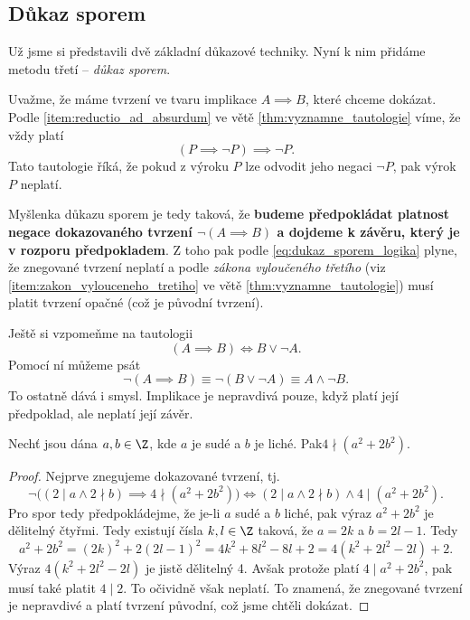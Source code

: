 \subsection{Důkaz sporem}\label{subsec:dukaz_sporem}
Už jsme si představili dvě základní důkazové techniky. Nyní k nim přidáme metodu třetí -- \emph{důkaz sporem}.\par
Uvažme, že máme tvrzení ve tvaru implikace $A \implies B$, které chceme dokázat. Podle \ref{item:reductio_ad_absurdum} ve větě \ref{thm:vyznamne_tautologie} víme, že vždy platí
\begin{equation}\label{eq:dukaz_sporem_logika}
    (P \implies \neg P) \implies \neg P.
\end{equation}
Tato tautologie říká, že pokud z výroku $P$ lze odvodit jeho negaci $\neg P$, pak výrok $P$ neplatí.\par
Myšlenka důkazu sporem je tedy taková, že \textbf{budeme předpokládat platnost negace dokazovaného tvrzení $\neg (A \implies B)$ a dojdeme k závěru, který je v rozporu předpokladem}. Z toho pak podle \eqref{eq:dukaz_sporem_logika} plyne, že znegované tvrzení neplatí a podle \emph{zákona vyloučeného třetího} (viz \ref{item:zakon_vylouceneho_tretiho} ve větě \ref{thm:vyznamne_tautologie}) musí platit tvrzení opačné (což je původní tvrzení).\par
Ještě si vzpomeňme na tautologii
\begin{equation*}
    (A \implies B) \iff B \lor \neg A.
\end{equation*}
Pomocí ní můžeme psát
\begin{equation*}
    \neg (A \implies B) \equiv \neg (B \lor \neg A) \equiv A \land \neg B.
\end{equation*}
To ostatně dává i smysl. Implikace je nepravdivá pouze, když platí její předpoklad, ale neplatí její závěr.
\begin{proposition}
    Nechť jsou dána $a,b\in\Z$, kde $a$ je sudé a $b$ je liché. Pak\linebreak $4 \nmid (a^2+2b^2)$.
\end{proposition}
\begin{proof}
    Nejprve znegujeme dokazované tvrzení, tj.
    \begin{equation*}
        \neg \big((2 \mid a \land 2 \nmid b) \implies 4 \nmid (a^2+2b^2)\big) \iff (2 \mid a \land 2 \nmid b) \land 4 \mid (a^2+2b^2).
    \end{equation*}
    Pro spor tedy předpokládejme, že je-li $a$ sudé a $b$ liché, pak výraz $a^2+2b^2$ je dělitelný čtyřmi. Tedy existují čísla $k,l\in\Z$ taková, že $a=2k$ a $b=2l-1$. Tedy
    \begin{equation*}
        a^2+2b^2=(2k)^2+2(2l-1)^2=4k^2+8l^2-8l+2=4(k^2+2l^2-2l)+2.
    \end{equation*}
    Výraz $4(k^2+2l^2-2l)$ je jistě dělitelný 4. Avšak protože platí $4 \mid a^2+2b^2$, pak musí také platit $4 \mid 2$. To očividně však neplatí. To znamená, že znegované tvrzení je nepravdivé a platí tvrzení původní, což jsme chtěli dokázat.
\end{proof}
